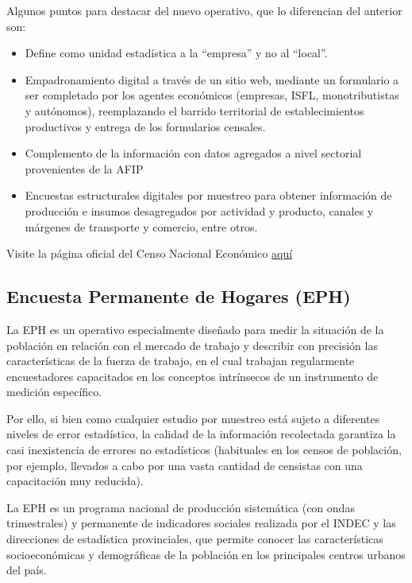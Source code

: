 \documentclass[
  openany]{book}
\providecommand{\tightlist}{%
  \setlength{\itemsep}{0pt}\setlength{\parskip}{0pt}}
\begin{document}
Algunos puntos para destacar del nuevo operativo, que lo diferencian del anterior son:

\begin{itemize}
\tightlist
\item
  Define como unidad estadística a la ``empresa'' y no al ``local''.
\item
  Empadronamiento digital a través de un sitio web, mediante un formulario a ser completado por los agentes económicos (empresas, ISFL, monotributistas y autónomos), reemplazando el barrido territorial de establecimientos productivos y entrega de los formularios censales.
\item
  Complemento de la información con datos agregados a nivel sectorial provenientes de la AFIP
\item
  Encuestas estructurales digitales por muestreo para obtener información de producción e insumos desagregados por actividad y producto, canales y márgenes de transporte y comercio, entre otros.
\end{itemize}

Visite la página oficial del Censo Nacional Económico \href{https://censoeconomico.indec.gob.ar/}{aquí}

\hypertarget{encuesta-permanente-de-hogares-eph}{%
\subsection{Encuesta Permanente de Hogares (EPH)}\label{encuesta-permanente-de-hogares-eph}}

La EPH es un operativo especialmente diseñado para medir la situación de la población en relación con el mercado de trabajo y describir con precisión las características de la fuerza de trabajo, en el cual trabajan regularmente encuestadores capacitados en los conceptos intrínsecos de un instrumento de medición específico.

Por ello, si bien como cualquier estudio por muestreo está sujeto a diferentes niveles de error estadístico, la calidad de la información recolectada garantiza la casi inexistencia de errores no estadísticos (habituales en los censos de población, por ejemplo, llevados a cabo por una vasta cantidad de censistas con una capacitación muy reducida).

La EPH es un programa nacional de producción sistemática (con ondas trimestrales) y permanente de indicadores sociales realizada por el INDEC y las direcciones de estadística provinciales, que permite conocer las características socioeconómicas y demográficas de la población en los principales centros urbanos del país.
\end{document}
